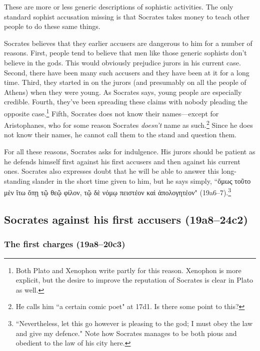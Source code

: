 \documentclass[11pt]{article}
\begin{document}
These are more or less generic descriptions of sophistic activities.  The only
standard sophist accusation missing is that Socrates takes money to teach other
people to do these same things.

Socrates believes that they earlier accusers are dangerous to him for a number
of reasons.  First, people tend to believe that men like those generic sophists
don't believe in the gods.  This would obviously prejudice jurors in his
current case.  Second, there have been many such accusers and they have been at
it for a long time.  Third, they started in on the jurors (and presumably on
all the people of Athens) when they were young.  As Socrates says, young people
are especially credible.  Fourth, they've been spreading these claims with
nobody pleading the opposite case.\footnote{Both Plato and Xenophon write
partly for this reason.  Xenophon is more explicit, but the desire to improve
the reputation of Socrates is clear in Plato as well.}  Fifth, Socrates does
not know their names---except for Aristophanes, who for some reason Socrates
\emph{doesn't} name as such.\footnote{He calls him ``a certain comic poet" at
17d1.  Is there some point to this?}  Since he does not know their names, he
cannot call them to the stand and question them.

For all these reasons, Socrates asks for indulgence.  His jurors should be
patient as he defends himself first against his first accusers and then against
his current ones.  Socrates also expresses doubt that he will be able to answer
this long-standing slander in the short time given to him, but he says simply,
``{\g ὅμως τοῦτο μὲν ἴτω ὅπῃ τῷ θεῷ φίλον, τῷ δὲ νόμῳ πειστέον καὶ
ἀπολογητέον}" (19a6--7).\footnote{``Nevertheless, let this go however is
pleasing to the god; I must obey the law and give my defence." Note how
Socrates manages to be both pious and obedient to the law of his city here.}


\subsection{Socrates against his first accusers (19a8--24c2)}

\subsubsection{The first charges (19a8--20c3)}
\end{document}
